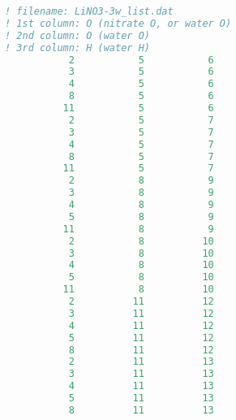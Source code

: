 \begin{lstlisting}[language=fortran]                  
! filename: LiNO3-3w_list.dat
! 1st column: O (nitrate O, or water O)
! 2nd column: O (water O)
! 3rd column: H (water H)
           2           5           6
           3           5           6
           4           5           6
           8           5           6
          11           5           6
           2           5           7
           3           5           7
           4           5           7
           8           5           7
          11           5           7
           2           8           9
           3           8           9
           4           8           9
           5           8           9
          11           8           9
           2           8          10
           3           8          10
           4           8          10
           5           8          10
          11           8          10
           2          11          12
           3          11          12
           4          11          12
           5          11          12
           8          11          12
           2          11          13
           3          11          13
           4          11          13
           5          11          13
           8          11          13
\end{lstlisting}
%

